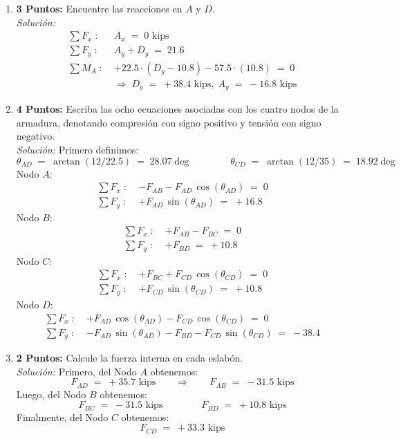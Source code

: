 \documentclass[ a4paper, twoside, 11pt]{article}
\begin{document}
\begin{problem}
\begin{enumerate}[label=\textbf{\alph*)}]
\item \textbf{3 Puntos:} Encuentre las reacciones en $A$ y $D$. \\[1ex] \emph{Soluci\'on:}
\begin{align*}
\sum F_x \; \colon \; & A_x \; = \; 0 \text{ kips} \\[1ex]
\sum F_y \; \colon \; & A_y + D_y \; = \; 21.6 \\[1ex]
\sum M_A \; \colon \; & +22.5 \cdot ( D_y - 10.8 ) - 57.5 \cdot (10.8) \; = \; 0 \\[1ex]
& \Longrightarrow \; D_y \; = \; +38.4 \text{ kips},
\; A_y \; = \; -16.8 \text{ kips}
\end{align*}
\item \textbf{4 Puntos:} Escriba las ocho ecuaciones asociadas con los cuatro nodos de la armadura, denotando compresi\'on con signo positivo y tensi\'on con signo negativo. \\[1ex] \emph{Soluci\'on:} Primero definimos: 
\[
\theta_{AD} \; = \; \arctan( 12 / 22.5 ) \; = \; 28.07\deg \qquad \qquad
\theta_{CD} \; = \; \arctan( 12 / 35 ) \; = \; 18.92\deg
\]
Nodo $A$: 
\begin{align*}
\sum F_x \; \colon \; & -F_{AB} -F_{AD} \, \cos(\theta_{AD}) \; = \; 0 \\[1ex]
\sum F_y \; \colon \; & +F_{AD} \, \sin(\theta_{AD}) \; = \; +16.8
\end{align*}
Nodo $B$: 
\begin{align*}
\sum F_x \; \colon \; & +F_{AB} -F_{BC} \; = \; 0 \\[1ex]
\sum F_y \; \colon \; & +F_{BD} \; = \; +10.8
\end{align*}
Nodo $C$: 
\begin{align*}
\sum F_x \; \colon \; & +F_{BC} + F_{CD} \, \cos(\theta_{CD}) \; = \; 0 \\[1ex]
\sum F_y \; \colon \; & +F_{CD} \, \sin(\theta_{CD}) \; = \; +10.8
\end{align*}
Nodo $D$: 
\begin{align*}
\sum F_x \; \colon \; & +F_{AD} \, \cos(\theta_{AD}) - F_{CD} \, \cos(\theta_{CD}) \; = \; 0 \\[1ex]
\sum F_y \; \colon \; & -F_{AD} \, \sin(\theta_{AD}) - F_{BD} - F_{CD} \, \sin(\theta_{CD}) \; = \; -38.4
\end{align*}

\item \textbf{2 Puntos:} Calcule la fuerza interna en cada eslab\'on. \\[1ex] \emph{Soluci\'on:} Primero, del Nodo $A$ obtenemos: 
\[
F_{AD} \; = \; +35.7 \text{ kips}
\qquad \Longrightarrow \qquad
F_{AB} \; = \; -31.5 \text{ kips}
\]
Luego, del Nodo $B$ obtenemos: 
\[
F_{BC} \; = \; -31.5 \text{ kips}
\qquad \qquad
F_{BD} \; = \; +10.8 \text{ kips}
\]
Finalmente, del Nodo $C$ obtenemos: 
\[
F_{CD} \; = \; +33.3 \text{ kips}
\]
\end{enumerate}

\end{problem}
\fullskip
\end{document}
